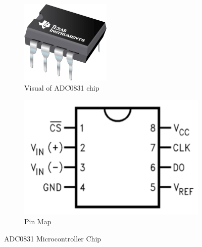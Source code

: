 \begin{figure}[ht]
\centering
\begin{subfigure}{.27\textwidth}
  \centering
  \includegraphics[width=\textwidth]{ADC0831-N.jpg}
  \caption{Visual of ADC0831 chip}
  \label{fig:sub3}
\end{subfigure}%
\hspace{3cm}
\begin{subfigure}{.3\textwidth}
  \centering
  \includegraphics[width=\textwidth]{adc0831.png}
  \caption{Pin Map}
  \label{fig:sub4}
\end{subfigure}
\caption{ADC0831 Microcontroller Chip}
\label{fig:chip}
\end{figure}
